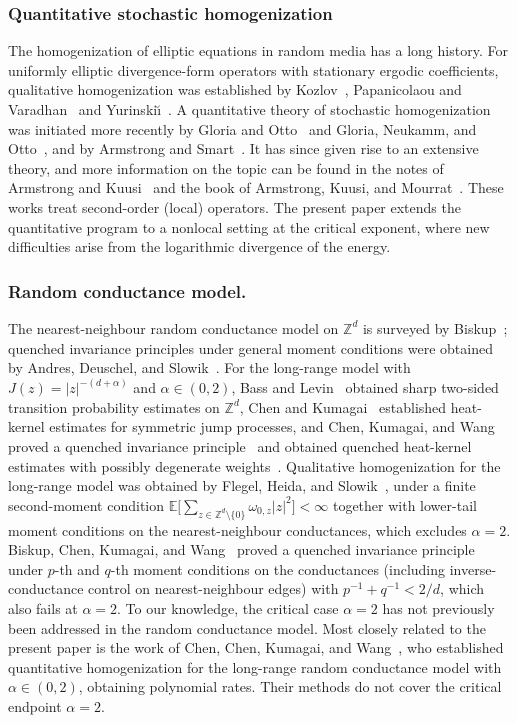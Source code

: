 \documentclass[11pt]{amsart}
\theoremstyle{plain}
\theoremstyle{definition}
\theoremstyle{remark}
\newcommand{\E}{\mathbb{E}}
\newcommand{\Zd}{\mathbb{Z}^d}
\begin{document}
	\subsubsection{Quantitative stochastic homogenization}
	The homogenization of elliptic equations in random media has a long history.
	For uniformly elliptic divergence-form operators with stationary ergodic coefficients, qualitative homogenization was established by Kozlov~\cite{Kozlov1979}, Papanicolaou and Varadhan~\cite{PapanicolaouVaradhan1981} and Yurinski\u{\i}~\cite{Y22}.
	A quantitative theory of stochastic homogenization was initiated more recently by Gloria and Otto~\cite{GO1,GO2} and Gloria, Neukamm, and Otto~\cite{GloriaNeukammOtto2015}, and by Armstrong and Smart~\cite{ArmstrongSmart2016}. It has since given rise to an extensive theory, and more information on the topic can be found in the notes of Armstrong and Kuusi~\cite{ArmstrongKuusi2022} and the book of Armstrong, Kuusi, and Mourrat~\cite{ArmstrongKuusiMourrat2019}.
	These works treat second-order (local) operators.
	The present paper extends the quantitative program to a nonlocal setting at the critical exponent, where new difficulties arise from the logarithmic divergence of the energy.
	
	\subsubsection{Random conductance model.}
	The nearest-neighbour random conductance model on $\Zd$ is surveyed by Biskup~\cite{Biskup2011}; quenched invariance principles under general moment conditions were obtained by Andres, Deuschel, and Slowik~\cite{AndresDeuschelSlowik2015}.
	For the long-range model with $J(z) = |z|^{-(d+\alpha)}$ and $\alpha \in (0,2)$, Bass and Levin~\cite{BassLevin2002} obtained sharp two-sided transition probability estimates on $\Zd$, Chen and Kumagai~\cite{ChenKumagai2008} established heat-kernel estimates for symmetric jump processes, and Chen, Kumagai, and Wang proved a quenched invariance principle~\cite{ChenKumagaiWang2021} and obtained quenched heat-kernel estimates with possibly degenerate weights~\cite{ChenKumagaiWang2020}.
	Qualitative homogenization for the long-range model was obtained by Flegel, Heida, and Slowik~\cite{FlegelHeidaSlowik2019}, under a finite second-moment condition $\E\bigl[\sum_{z \in \Zd \setminus \{0\}} \omega_{0,z}|z|^2\bigr] < \infty$ together with lower-tail moment conditions on the nearest-neighbour conductances, which excludes $\alpha = 2$.
	Biskup, Chen, Kumagai, and Wang~\cite{BiskupChenKumagaiWang2021} proved a quenched invariance principle under $p$-th and $q$-th moment conditions on the conductances (including inverse-conductance control on nearest-neighbour edges) with $p^{-1} + q^{-1} < 2/d$, which also fails at $\alpha = 2$.
	To our knowledge, the critical case $\alpha = 2$ has not previously been addressed in the random conductance model.
	Most closely related to the present paper is the work of Chen, Chen, Kumagai, and Wang~\cite{ChenChenKumagaiWang2025}, who established quantitative homogenization for the long-range random conductance model with $\alpha \in (0,2)$, obtaining polynomial rates.
	Their methods do not cover the critical endpoint $\alpha = 2$.
	
\end{document}
